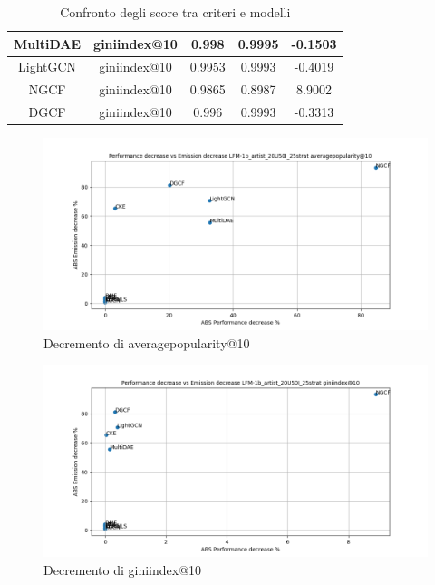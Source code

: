 \begin{table}[H]
{\begin{tabular}{|c|c|c|c|c|}
            MultiDAE         & giniindex@10       & 0.998                            & 0.9995                         & -0.1503                    \\ \hline
            LightGCN         & giniindex@10       & 0.9953                           & 0.9993                          & -0.4019                    \\ \hline
            NGCF             & giniindex@10       & 0.9865                           & 0.8987                         & 8.9002                      \\ \hline
            DGCF             & giniindex@10       & 0.996                           & 0.9993                         & -0.3313                    \\ \hline
        \end{tabular}
    }
    \caption{Confronto degli score tra criteri e modelli}
\end{table}



\begin{figure}[H]
    \centering
    \includegraphics[scale=0.5]{images/decrement_averagepopularity@10_LFM-1b_artist_20U50I_25strat.png}
    \caption{Decremento di averagepopularity@10}
\end{figure}

\begin{figure}[H]
    \centering
    \includegraphics[scale=0.5]{images/decrement_giniindex@10_LFM-1b_artist_20U50I_25strat.png}
    \caption{Decremento di giniindex@10}
\end{figure}

